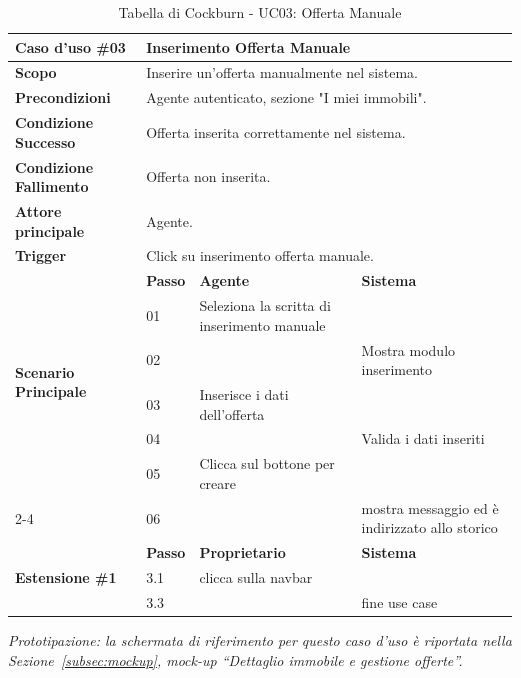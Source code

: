 \documentclass[a4paper,11pt]{article}
\renewcommand{\arraystretch}{1.18}
\begin{document}
\begin{table}[H]
\centering
\renewcommand{\arraystretch}{1.5}
\begin{tabular}{|p{3cm}|l|p{4.5cm}|p{4.5cm}|}
\hline
\rowcolor[HTML]{010066} 
{\color[HTML]{EFEFEF} \textbf{Caso d'uso \#03}} & \multicolumn{3}{l|}{\color[HTML]{FFFFFF} \textbf{Inserimento Offerta Manuale}} \\ \hline

\textbf{Scopo} & \multicolumn{3}{l|}{Inserire un'offerta manualmente nel sistema.} \\ \hline

\textbf{Precondizioni} & \multicolumn{3}{l|}{Agente autenticato, sezione "I miei immobili".} \\ \hline

\textbf{Condizione Successo} & \multicolumn{3}{l|}{Offerta inserita correttamente nel sistema.} \\ \hline

\textbf{Condizione Fallimento} & \multicolumn{3}{l|}{Offerta non inserita.} \\ \hline

\textbf{Attore principale} & \multicolumn{3}{l|}{Agente.} \\ \hline

\textbf{Trigger} & \multicolumn{3}{l|}{Click su inserimento offerta manuale.} \\ \hline

\hline
\multirow{6}{3cm}{\textbf{Scenario Principale}} 
   & \textbf{Passo} & \textbf{Agente} & \textbf{Sistema} \\ \cline{2-4}
   & 01 & Seleziona la scritta di inserimento manuale & \\ \cline{2-4}
   & 02 & & Mostra modulo inserimento \\ \cline{2-4}
   & 03 & Inserisce i dati dell'offerta & \\ \cline{2-4}
   & 04 & & Valida i dati inseriti \\ \cline{2-4}
   & 05 & Clicca sul bottone per creare & \\ \cline{2-4}
   & 06 & & mostra messaggio ed è indirizzato allo storico \\ \hline

\hline
\multirow{3}{3cm}{\textbf{Estensione \#1}} 
   & \textbf{Passo} & \textbf{Proprietario} & \textbf{Sistema} \\ \cline{2-4}
   & 3.1 & clicca sulla navbar & \\ \cline{2-4}
   & 3.3 & & fine use case \\ \hline

\end{tabular}
\caption{Tabella di Cockburn - UC03: Offerta Manuale}
\end{table}
\smallskip
\noindent\textit{Prototipazione: la schermata di riferimento per questo caso d'uso è riportata nella Sezione~\ref{subsec:mockup}, mock-up ``Dettaglio immobile e gestione offerte''.}
\end{document}

